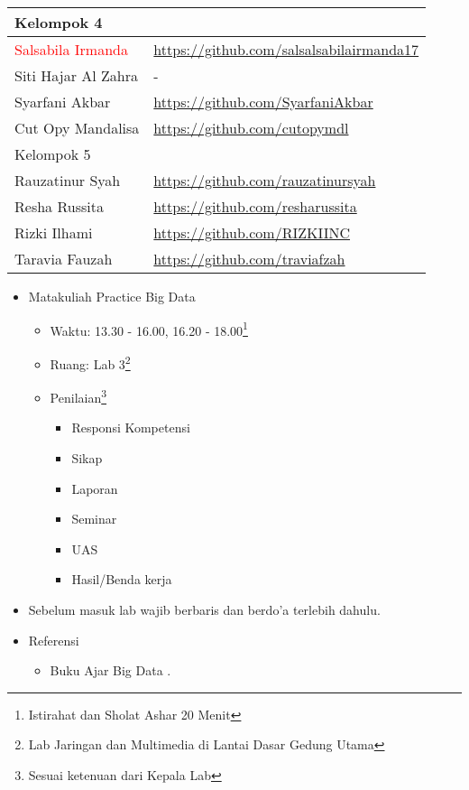 \documentclass[a4paper]{tufte-handout}
\begin{document}
\begin{projects}
\begin{description}
\begin{table}[!ht]
\begin{tabular}{ll}
\midrule
Kelompok 4\\
\midrule
\textcolor{red}{Salsabila Irmanda}		& \url{https://github.com/salsalsabilairmanda17} \\
Siti Hajar Al Zahra		& - \\
Syarfani Akbar			& \url{https://github.com/SyarfaniAkbar} \\
Cut Opy Mandalisa		& \url{https://github.com/cutopymdl} \\
\midrule
Kelompok 5\\
\midrule
Rauzatinur Syah		& \url{https://github.com/rauzatinursyah} \\
Resha Russita		& \url{https://github.com/resharussita} \\
Rizki Ilhami		& \url{https://github.com/RIZKIINC} \\
Taravia Fauzah		& \url{https://github.com/traviafzah} \\
\midrule
\end{tabular}
\end{table}
	\end{description}
\end{projects}


\begin{maybe}
    \begin{itemize}
    	\item Matakuliah Practice Big Data
    	\begin{itemize}
    	\item Waktu: 13.30 - 16.00, 16.20 - 18.00\footnote{Istirahat dan Sholat Ashar 20 Menit}
    	\item Ruang: Lab 3\footnote{Lab Jaringan dan Multimedia di Lantai Dasar Gedung Utama}
    	\item Penilaian\footnote{Sesuai ketenuan dari Kepala Lab}
    	\begin{itemize}
    	\item Responsi Kompetensi
    	\item Sikap
    	\item Laporan
    	\item Seminar
    	\item UAS
    	\item Hasil/Benda kerja
    	\end{itemize}
    	\end{itemize}
    	\item Sebelum masuk lab wajib berbaris dan berdo'a terlebih dahulu.
    	\item Referensi
    	\begin{itemize}
    		\item Buku Ajar Big Data \citep{Mursyidah2020}.
    	\end{itemize}
    \end{itemize}
\end{maybe}
\end{document}

